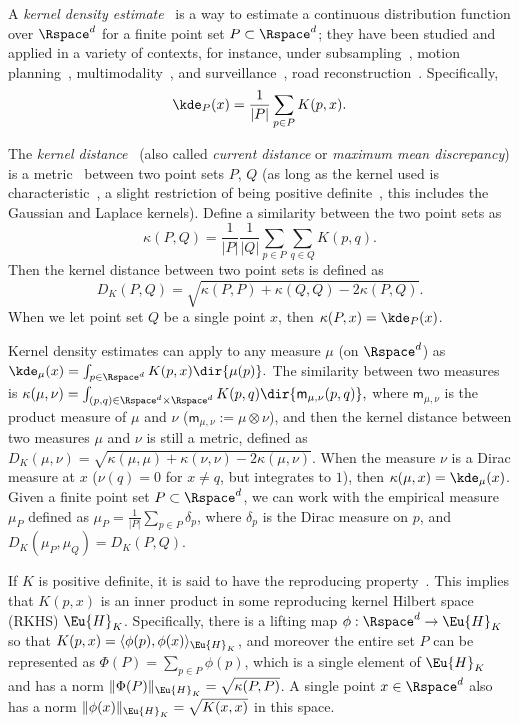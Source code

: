 \documentclass[11pt]{myclass}
\begin{document}
A \emph{kernel density estimate}~\cite{Sil86,Sco92,DG84,DL01} is a way to estimate a continuous distribution function over $\Rspace^d$ for a finite point set $P \subset \Rspace^d$; they have been studied and applied in a variety of contexts, for instance, under subsampling~\cite{Phillips2013,big-kde,BFLRSW13}, motion planning~\cite{PEKK12}, multimodality~\cite{Sil81,EFR12}, and surveillance~\cite{EDHD02}, road reconstruction~\cite{BE12}.
Specifically, 
\[
\kde_P(x) = \frac{1}{|P|} \sum_{p \in P} K(p,x). 
\]

The \emph{kernel distance}~\cite{HB05,glaunesthesis,
JoshiKommarajuPhillips2011,PhillipsVenkatasubramanian2011} (also called \emph{current distance} or \emph{maximum mean discrepancy}) is a metric~\cite{Muller1997,SGFSL10} between two point sets $P$, $Q$ (as long as the kernel used is characteristic~\cite{SGFSL10}, a slight restriction of being positive definite~\cite{Aronszajn1950,Wah99}, this includes the Gaussian and Laplace kernels).
Define a similarity between the two point sets as 
\[
\kappa(P,Q) = \frac{1}{|P|}\frac{1}{|Q|} \sum_{p \in P} \sum_{q \in Q} K(p,q).
\] 
Then the kernel distance between two point sets is defined as \vspace{-1mm}
\[
D_K(P,Q) = \sqrt{\kappa(P,P) + \kappa(Q,Q) - 2 \kappa(P,Q)}.
\]
When we let point set $Q$ be a single point $x$, then $\kappa(P,x) = \kde_P(x)$.  

Kernel density estimates can apply to any measure $\mu$ (on $\Rspace^d$) as 
$
\kde_\mu(x) = \int_{p \in \Rspace^d} K(p,x) \dir{\mu(p)}.  
$ 
The similarity between two measures is 
$
\kappa(\mu,\nu) = \int_{(p,q) \in \Rspace^d \times \Rspace^d} K(p,q) \dir{\textsf{m}_{\mu,\nu}(p,q)}, 
$ 
where $\textsf{m}_{\mu,\nu}$ is the product measure of $\mu$ and $\nu$ ($\textsf{m}_{\mu,\nu}:= \mu \otimes \nu$), and then the kernel distance between two measures $\mu$ and $\nu$ is still a metric, defined as  
$
D_K(\mu,\nu) = \sqrt{\kappa(\mu,\mu) + \kappa(\nu,\nu) - 2 \kappa(\mu,\nu)}.
$ 
When the measure $\nu$ is a Dirac measure at $x$ ($\nu(q) = 0$ for $x \neq q$, but integrates to $1$), then $\kappa(\mu,x) = \kde_{\mu}(x)$.  
Given a finite point set $P \subset \Rspace^d$, we can work with the empirical measure $\mu_P$ defined as $\mu_P = \frac{1}{|P|} \sum_{p \in P} \delta_p$, where $\delta_p$ is the Dirac measure on $p$, and $D_K(\mu_P, \mu_Q) = D_K(P,Q)$.  


If $K$ is positive definite, it is said to have the reproducing property~\cite{Aronszajn1950,Wah99}.
This implies that $K(p,x)$ is an inner product in some reproducing kernel Hilbert space (RKHS) $\Eu{H}_K$.  Specifically, there is a lifting map $\phi : \Rspace^d \to \Eu{H}_K$ so that $K(p,x) = \langle \phi(p), \phi(x) \rangle_{\Eu{H}_K}$, and moreover the entire set $P$ can be represented as $\Phi(P) = \sum_{p \in P} \phi(p)$, which is a single element of $\Eu{H}_K$ and has a norm $\|\Phi(P)\|_{\Eu{H}_K} = \sqrt{\kappa(P,P)}$.  A single point $x \in \Rspace^d$ also has a norm $\|\phi(x)\|_{\Eu{H}_K} = \sqrt{K(x,x)}$ in this space.
\end{document}
